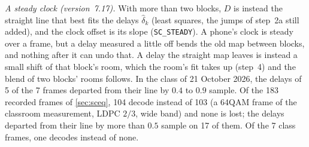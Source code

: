\documentclass[11pt,a4paper]{article}
\newcommand{\code}[1]{\texttt{#1}}
\theoremstyle{remark}
\begin{document}
\emph{A steady clock (version~7.17).} With more than two blocks, $D$ is instead the straight line that best fits the delays $\hat\delta_k$ (least squares, the jumps of step~2a still added), and the clock offset is its slope (\code{SC\_STEADY}). A phone's clock is steady over a frame, but a delay measured a little off bends the old map between blocks, and nothing after it can undo that. A delay the straight map leaves is instead a small shift of that block's room, which the room's fit takes up (step~4) and the blend of two blocks' rooms follows. In the class of 21 October 2026, the delays of 5 of the 7 frames departed from their line by $0.4$ to $0.9$ sample. Of the 183 recorded frames of \cref{sec:sceq}, 104 decode instead of 103 (a 64QAM frame of the classroom measurement, LDPC $2/3$, wide band) and none is lost; the delays departed from their line by more than $0.5$ sample on 17 of them. Of the 7 class frames, one decodes instead of none.
\end{document}
